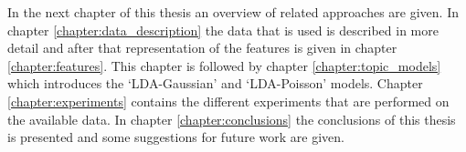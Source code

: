 In the next chapter of this thesis an overview of related approaches are given. In chapter \ref{chapter:data_description} the data that is used is described in more detail and after that representation of the features is given in chapter \ref{chapter:features}. This chapter is followed by chapter \ref{chapter:topic_models} which introduces the `LDA-Gaussian' and `LDA-Poisson' models. Chapter \ref{chapter:experiments} contains the different experiments that are performed on the available data. In chapter \ref{chapter:conclusions} the conclusions of this thesis is presented and some suggestions for future work are given.


